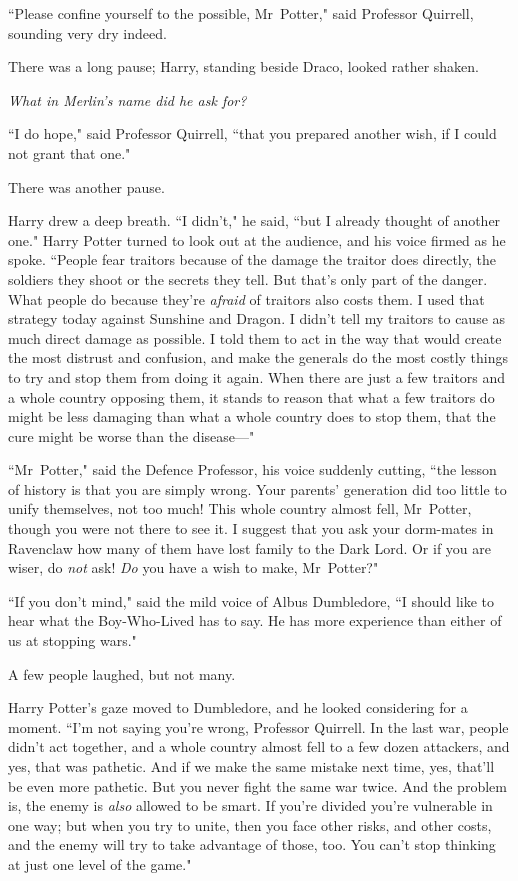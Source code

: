 ``Please confine yourself to the possible, Mr~Potter," said Professor Quirrell, sounding very dry indeed.

There was a long pause; Harry, standing beside Draco, looked rather shaken.

\emph{What in Merlin's name did he ask for?}

``I do hope," said Professor Quirrell, ``that you prepared another wish, if I could not grant that one."

There was another pause.

Harry drew a deep breath. ``I didn't," he said, ``but I already thought of another one." Harry Potter turned to look out at the audience, and his voice firmed as he spoke. ``People fear traitors because of the damage the traitor does directly, the soldiers they shoot or the secrets they tell. But that's only part of the danger. What people do because they're \emph{afraid} of traitors also costs them. I used that strategy today against Sunshine and Dragon. I didn't tell my traitors to cause as much direct damage as possible. I told them to act in the way that would create the most distrust and confusion, and make the generals do the most costly things to try and stop them from doing it again. When there are just a few traitors and a whole country opposing them, it stands to reason that what a few traitors do might be less damaging than what a whole country does to stop them, that the cure might be worse than the disease—"

``Mr~Potter," said the Defence Professor, his voice suddenly cutting, ``the lesson of history is that you are simply wrong. Your parents' generation did too little to unify themselves, not too much! This whole country almost fell, Mr~Potter, though you were not there to see it. I suggest that you ask your dorm-mates in Ravenclaw how many of them have lost family to the Dark Lord. Or if you are wiser, do \emph{not} ask! \emph{Do} you have a wish to make, Mr~Potter?"

``If you don't mind," said the mild voice of Albus Dumbledore, ``I should like to hear what the Boy-Who-Lived has to say. He has more experience than either of us at stopping wars."

A few people laughed, but not many.

Harry Potter's gaze moved to Dumbledore, and he looked considering for a moment. ``I'm not saying you're wrong, Professor Quirrell. In the last war, people didn't act together, and a whole country almost fell to a few dozen attackers, and yes, that was pathetic. And if we make the same mistake next time, yes, that'll be even more pathetic. But you never fight the same war twice. And the problem is, the enemy is \emph{also} allowed to be smart. If you're divided you're vulnerable in one way; but when you try to unite, then you face other risks, and other costs, and the enemy will try to take advantage of those, too. You can't stop thinking at just one level of the game."

